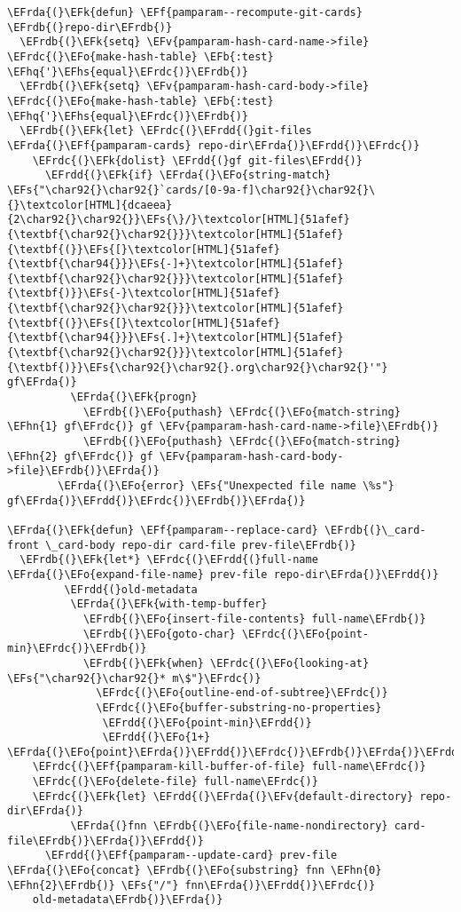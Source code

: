 \documentclass[a4wide,10pt]{article}
\newcommand{\EFs}[1]{\textcolor{EFs}{#1}} %
\newcommand{\EFk}[1]{\textcolor{EFk}{#1}} %
\newcommand{\EFb}[1]{\textcolor{EFb}{#1}} %
\newcommand{\EFf}[1]{\textcolor{EFf}{#1}} %
\newcommand{\EFv}[1]{\textcolor{EFv}{#1}} %
\newcommand{\EFo}[1]{\textcolor{EFo}{#1}} %
\newcommand{\EFhn}[1]{\textcolor{EFhn}{\textbf{#1}}} %
\newcommand{\EFhq}[1]{\textcolor{EFhq}{#1}} %
\newcommand{\EFhs}[1]{\textcolor{EFhs}{#1}} %
\newcommand{\EFrda}[1]{\textcolor{EFrda}{#1}} %
\newcommand{\EFrdb}[1]{\textcolor{EFrdb}{#1}} %
\newcommand{\EFrdc}[1]{\textcolor{EFrdc}{#1}} %
\newcommand{\EFrdd}[1]{\textcolor{EFrdd}{#1}} %
\begin{document}
\begin{Code}
\begin{Verbatim}
\EFrda{(}\EFk{defun} \EFf{pamparam--recompute-git-cards} \EFrdb{(}repo-dir\EFrdb{)}
  \EFrdb{(}\EFk{setq} \EFv{pamparam-hash-card-name->file} \EFrdc{(}\EFo{make-hash-table} \EFb{:test} \EFhq{'}\EFhs{equal}\EFrdc{)}\EFrdb{)}
  \EFrdb{(}\EFk{setq} \EFv{pamparam-hash-card-body->file} \EFrdc{(}\EFo{make-hash-table} \EFb{:test} \EFhq{'}\EFhs{equal}\EFrdc{)}\EFrdb{)}
  \EFrdb{(}\EFk{let} \EFrdc{(}\EFrdd{(}git-files \EFrda{(}\EFf{pamparam-cards} repo-dir\EFrda{)}\EFrdd{)}\EFrdc{)}
    \EFrdc{(}\EFk{dolist} \EFrdd{(}gf git-files\EFrdd{)}
      \EFrdd{(}\EFk{if} \EFrda{(}\EFo{string-match} \EFs{"\char92{}\char92{}`cards/[0-9a-f]\char92{}\char92{}\{}\textcolor[HTML]{dcaeea}{2\char92{}\char92{}}\EFs{\}/}\textcolor[HTML]{51afef}{\textbf{\char92{}\char92{}}}\textcolor[HTML]{51afef}{\textbf{(}}\EFs{[}\textcolor[HTML]{51afef}{\textbf{\char94{}}}\EFs{-]+}\textcolor[HTML]{51afef}{\textbf{\char92{}\char92{}}}\textcolor[HTML]{51afef}{\textbf{)}}\EFs{-}\textcolor[HTML]{51afef}{\textbf{\char92{}\char92{}}}\textcolor[HTML]{51afef}{\textbf{(}}\EFs{[}\textcolor[HTML]{51afef}{\textbf{\char94{}}}\EFs{.]+}\textcolor[HTML]{51afef}{\textbf{\char92{}\char92{}}}\textcolor[HTML]{51afef}{\textbf{)}}\EFs{\char92{}\char92{}.org\char92{}\char92{}'"} gf\EFrda{)}
          \EFrda{(}\EFk{progn}
            \EFrdb{(}\EFo{puthash} \EFrdc{(}\EFo{match-string} \EFhn{1} gf\EFrdc{)} gf \EFv{pamparam-hash-card-name->file}\EFrdb{)}
            \EFrdb{(}\EFo{puthash} \EFrdc{(}\EFo{match-string} \EFhn{2} gf\EFrdc{)} gf \EFv{pamparam-hash-card-body->file}\EFrdb{)}\EFrda{)}
        \EFrda{(}\EFo{error} \EFs{"Unexpected file name \%s"} gf\EFrda{)}\EFrdd{)}\EFrdc{)}\EFrdb{)}\EFrda{)}

\EFrda{(}\EFk{defun} \EFf{pamparam--replace-card} \EFrdb{(}\_card-front \_card-body repo-dir card-file prev-file\EFrdb{)}
  \EFrdb{(}\EFk{let*} \EFrdc{(}\EFrdd{(}full-name \EFrda{(}\EFo{expand-file-name} prev-file repo-dir\EFrda{)}\EFrdd{)}
         \EFrdd{(}old-metadata
          \EFrda{(}\EFk{with-temp-buffer}
            \EFrdb{(}\EFo{insert-file-contents} full-name\EFrdb{)}
            \EFrdb{(}\EFo{goto-char} \EFrdc{(}\EFo{point-min}\EFrdc{)}\EFrdb{)}
            \EFrdb{(}\EFk{when} \EFrdc{(}\EFo{looking-at} \EFs{"\char92{}\char92{}* m\$"}\EFrdc{)}
              \EFrdc{(}\EFo{outline-end-of-subtree}\EFrdc{)}
              \EFrdc{(}\EFo{buffer-substring-no-properties}
               \EFrdd{(}\EFo{point-min}\EFrdd{)}
               \EFrdd{(}\EFo{1+} \EFrda{(}\EFo{point}\EFrda{)}\EFrdd{)}\EFrdc{)}\EFrdb{)}\EFrda{)}\EFrdd{)}\EFrdc{)}
    \EFrdc{(}\EFf{pamparam-kill-buffer-of-file} full-name\EFrdc{)}
    \EFrdc{(}\EFo{delete-file} full-name\EFrdc{)}
    \EFrdc{(}\EFk{let} \EFrdd{(}\EFrda{(}\EFv{default-directory} repo-dir\EFrda{)}
          \EFrda{(}fnn \EFrdb{(}\EFo{file-name-nondirectory} card-file\EFrdb{)}\EFrda{)}\EFrdd{)}
      \EFrdd{(}\EFf{pamparam--update-card} prev-file \EFrda{(}\EFo{concat} \EFrdb{(}\EFo{substring} fnn \EFhn{0} \EFhn{2}\EFrdb{)} \EFs{"/"} fnn\EFrda{)}\EFrdd{)}\EFrdc{)}
    old-metadata\EFrdb{)}\EFrda{)}


\end{Verbatim}
\end{Code}
\end{document}
